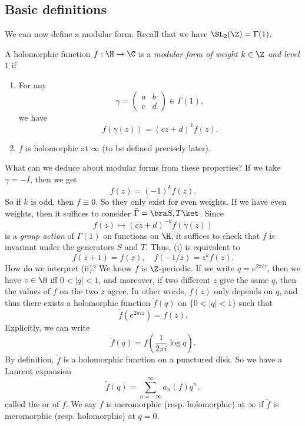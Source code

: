 \documentclass[a4paper]{article}
\begin{document}
\subsection{Basic definitions}
We can now define a modular form. Recall that we have $\SL_2(\Z) = \Gamma(1)$.
\begin{defi}
  A holomorphic function $f: \H \to \C$ is a \emph{modular form of weight $k \in \Z$ and level $1$} if
  \begin{enumerate}
    \item For any
      \[
        \gamma =
        \begin{pmatrix}
          a & b\\
          c & d
        \end{pmatrix} \in \Gamma(1),
      \]
      we have
      \[
        f(\gamma(z)) = (cz + d)^k f(z).
      \]
    \item $f$ is holomorphic at $\infty$ (to be defined precisely later).
  \end{enumerate}
\end{defi}
What can we deduce about modular forms from these properties? If we take $\gamma = -I$, then we get
\[
  f(z) = (-1)^k f(z).
\]
So if $k$ is odd, then $f \equiv 0$. So they only exist for even weights. If we have even weights, then it suffices to consider $\bar{\Gamma} = \bra S, T\ket$. Since
\[
  f(z) \mapsto (cz + d)^{-k} f(\gamma(z))
\]
is a \emph{group action} of $\Gamma(1)$ on functions on $\H$, it suffices to check that $f$ is invariant under the generators $S$ and $T$. Thus, (i) is equivalent to
\[
  f(z + 1) = f(z),\quad f(-1/z) = z^k f(z).
\]
How do we interpret (ii)? We know $f$ is $\Z$-periodic. If we write $q = e^{2\pi i z}$, then we have $z \in \H$ iff $0 < |q| < 1$, and moreover, if two different $z$ give the same $q$, then the values of $f$ on the two $z$ agree. In other words, $f(z)$ only depends on $q$, and thus there exists a holomorphic function $\tilde{f}(q)$ on $\{0< |q| < 1\}$ such that
\[
  \tilde{f}(e^{2\pi i z}) = f(z).
\]
Explicitly, we can write
\[
  \tilde{f}(q) = f\left(\frac{1}{2\pi i} \log q\right).
\]
By definition, $\tilde{f}$ is a holomorphic function on a punctured disk. So we have a Laurent expansion
\[
  \tilde{f}(q) = \sum_{n = -\infty}^\infty a_n (f) q^n,
\]
called the  or  of $f$. We say $f$ is meromorphic (resp. holomorphic) at $\infty$ if $\tilde{f}$ is meromorphic (resp. holomorphic) at $q = 0$.
\end{document}
